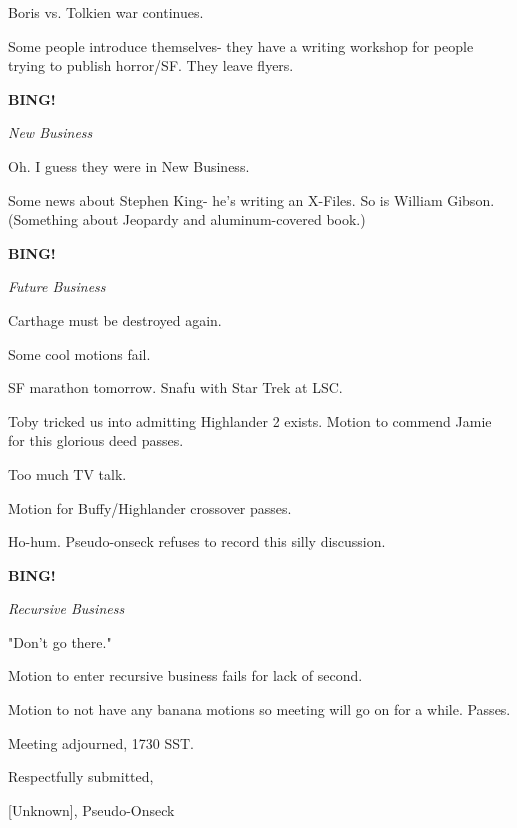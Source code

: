 \documentclass[12pt]{article}
\newcommand{\bing}{{\bf BING!} }
\newcommand{\goto}[1]{\bing \vskip 12pt \centerline{{\em{#1}}}}
\begin{document}
Boris vs. Tolkien war continues.

Some people introduce themselves- they have a writing workshop for people trying to publish horror/SF. They leave flyers.

\goto{New Business}

Oh. I guess they were in New Business.

Some news about Stephen King- he's writing an X-Files. So is William Gibson. (Something about Jeopardy and aluminum-covered book.)

\goto{Future Business}

Carthage must be destroyed again.

Some cool motions fail.

SF marathon tomorrow. Snafu with Star Trek at LSC.

Toby tricked us into admitting Highlander 2 exists. Motion to commend Jamie for this glorious deed passes.

Too much TV talk.

Motion for Buffy/Highlander crossover passes.

Ho-hum. Pseudo-onseck refuses to record this silly discussion.

\goto{Recursive Business}

"Don't go there."

Motion to enter recursive business fails for lack of second.

Motion to not have any banana motions so meeting will go on for a while. Passes.

\vspace{12pt}

\noindent
Meeting adjourned, 1730 SST.

\vspace{18pt}

\centerline{Respectfully submitted,}
\centerline{[Unknown], Pseudo-Onseck}
\end{document}
